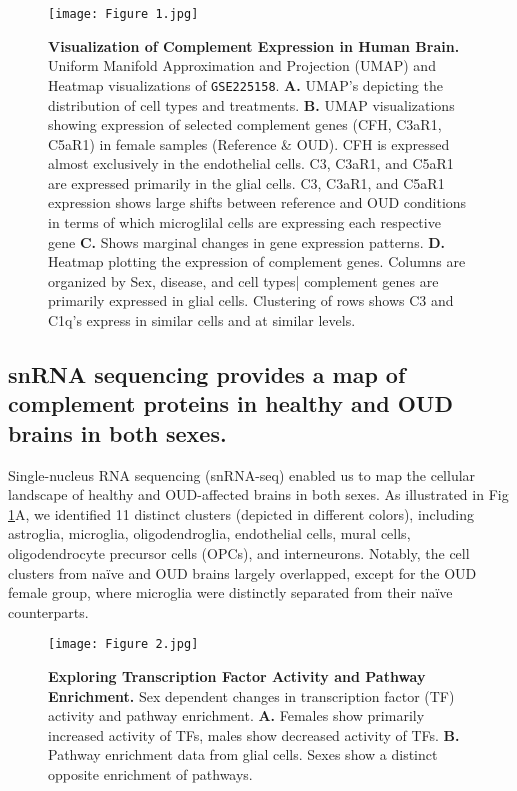 \documentclass[10pt,letterpaper]{article}
\begin{document}
\begin{figure}[ht] %
\texttt{[image: Figure 1.jpg]}
\caption{\color{Gray} \textbf{Visualization of Complement Expression in Human Brain.} 
Uniform Manifold Approximation and Projection (UMAP) and Heatmap visualizations of \texttt{GSE225158}. \textbf{A.} UMAP's depicting the distribution of cell types and treatments. \textbf{B.} UMAP visualizations showing expression of selected complement genes (CFH, C3aR1, C5aR1) in female samples (Reference \& OUD). CFH is expressed almost exclusively in the endothelial cells. C3, C3aR1, and C5aR1 are expressed primarily in the glial cells. C3, C3aR1, and C5aR1 expression shows large shifts between reference and OUD conditions in terms of which microglilal cells are expressing each respective gene \textbf{C.} Shows marginal changes in gene expression patterns. \textbf{D.} Heatmap plotting the expression of complement genes. Columns are organized by Sex, disease, and cell types| complement genes are primarily expressed in glial cells. Clustering of rows shows C3 and C1q's express in similar cells and at similar levels.
}
\label{Complement in Brain} %
\end{figure}

\subsection*{snRNA sequencing provides a map of complement proteins in healthy and OUD brains in both sexes.}
    Single-nucleus RNA sequencing (snRNA-seq) enabled us to map the cellular landscape of healthy and OUD-affected brains in both sexes. As illustrated in Fig \ref{Complement in Brain}A, we identified 11 distinct clusters (depicted in different colors), including astroglia, microglia, oligodendroglia, endothelial cells, mural cells, oligodendrocyte precursor cells (OPCs), and interneurons. Notably, the cell clusters from naïve and OUD brains largely overlapped, except for the OUD female group, where microglia were distinctly separated from their naïve counterparts.

\begin{figure}[ht] %
\texttt{[image: Figure 2.jpg]}
\caption{\color{Gray} \textbf{Exploring Transcription Factor Activity and Pathway Enrichment. } 
Sex dependent changes in transcription factor (TF) activity and pathway enrichment. \textbf{A.} Females show primarily increased activity of TFs, males show decreased activity of TFs. \textbf{B.} Pathway enrichment data from glial cells. Sexes show a distinct opposite enrichment of pathways.
}
\label{TF and Pathways} %
\end{figure}
\end{document}
